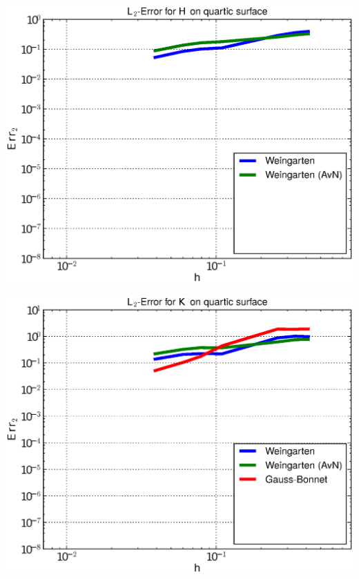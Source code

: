 \documentclass[handout]{beamer}
\begin{document}
\begin{frame}
\begin{overprint}
\begin{minipage}[t]{0.49\textwidth}
            \centering\includegraphics[width=\textwidth]{bilder/Curvature/heineB/ErrHL2_2.eps}
          \end{minipage}
          \begin{minipage}[t]{0.49\textwidth}
            \centering\includegraphics[width=\textwidth]{bilder/Curvature/heineB/ErrKL2_3.eps}
          \end{minipage}\hfill
          \begin{minipage}[t]{0.49\textwidth}

\end{minipage}
\end{overprint}
\end{frame}
\end{document}
